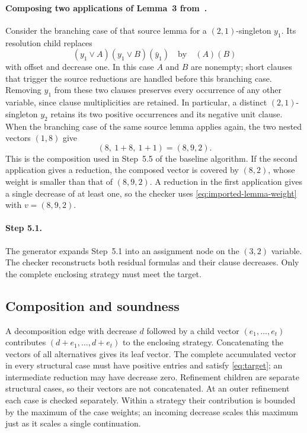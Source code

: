 \documentclass[11pt]{article}
\theoremstyle{definition}
\theoremstyle{remark}
\begin{document}
\paragraph{Composing two applications of Lemma~3 from~\cite{Xiao2022}.}
Consider the branching case of that source lemma for a $(2,1)$-singleton $y_1$.
Its resolution child replaces
\[
 (y_1\vee A)(y_1\vee B)(\bar y_1)
 \quad\text{by}\quad (A)(B)
\]
with offset and decrease one. In this case $A$ and $B$ are nonempty; short
clauses that trigger the source reductions are handled before this branching
case. Removing $y_1$ from these two clauses preserves every occurrence of any
other variable, since clause multiplicities are retained. In particular, a
distinct $(2,1)$-singleton $y_2$ retains its two positive occurrences and its
negative unit clause. When the branching case of the same source lemma applies again, the
two nested vectors $(1,8)$ give
\[
 (8,\ 1+8,\ 1+1)=(8,9,2).
\]
This is the composition used in Step~5.5 of the baseline algorithm. If the
second application gives a reduction, the composed vector is covered by
$(8,2)$, whose weight is smaller than that of $(8,9,2)$. A reduction in the
first application gives a single decrease of at least one, so the checker
uses \cref{eq:imported-lemma-weight} with $v=(8,9,2)$.

\paragraph{Step 5.1.}
The generator expands Step~5.1 into an assignment node on the $(3,2)$
variable. The checker reconstructs both residual formulas and their clause
decreases. Only the complete enclosing strategy must meet the target.

\subsection{Composition and soundness}
\label{sec:checker}

A decomposition edge with decrease $d$ followed by a child vector
$(e_1,\ldots,e_t)$ contributes $(d+e_1,\ldots,d+e_t)$ to the enclosing
strategy. Concatenating the vectors of all alternatives gives its leaf
vector. The complete accumulated vector in every structural case must have
positive entries and satisfy \cref{eq:target}; an intermediate reduction
may have decrease zero.
Refinement children are separate structural cases, so their vectors are
not concatenated. At an outer refinement each case is checked separately.
Within a strategy their contribution is bounded by the maximum of the case
weights; an incoming decrease scales this maximum just as it scales a
single continuation.
\end{document}
